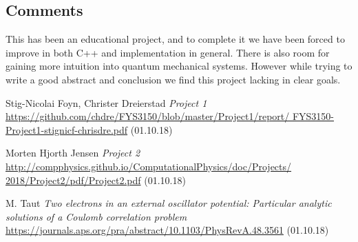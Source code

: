\documentclass{emulateapj}
\begin{document}
\subsection{Comments}
This has been an educational project, and to complete it we have been forced to improve in both C++ and implementation in general. There is also room for gaining more intuition into quantum mechanical systems. However while trying to write a good abstract and conclusion we find this project lacking in clear goals.

%
%







\begin{acknowledgements}
\end{acknowledgements}


\begin{thebibliography}{9}

 Stig-Nicolai Foyn, Christer Dreierstad
\textit{Project 1}
\url{https://github.com/chdre/FYS3150/blob/master/Project1/report/
FYS3150-Project1-stignicf-chrisdre.pdf} (01.10.18)

 Morten Hjorth Jensen
\textit{Project 2}
\url{http://compphysics.github.io/ComputationalPhysics/doc/Projects/
2018/Project2/pdf/Project2.pdf} (01.10.18)

 M. Taut
\textit{Two electrons in an external oscillator potential: Particular analytic solutions of a Coulomb correlation problem}
\url{https://journals.aps.org/pra/abstract/10.1103/PhysRevA.48.3561} (01.10.18)

\end{thebibliography}
\end{document}
